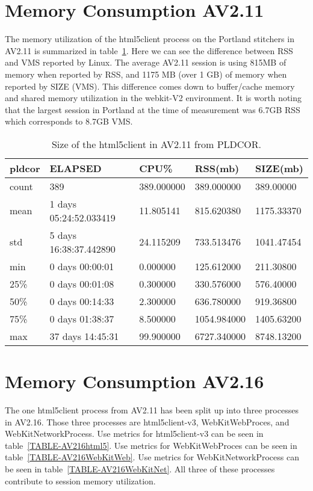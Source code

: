 \documentclass{article}
\begin{document}
\section{Memory Consumption AV2.11}
\label{SECTION-211Memory}


The memory utilization of the html5client process on the Portland stitchers in AV2.11 is summarized in table~\ref{TABLE-AV211SessionSize}. Here we can see the difference between RSS and VMS reported by Linux. The average AV2.11 session is using 815MB of memory when reported by RSS, and 1175 MB (over 1 GB) of memory when reported by SIZE (VMS). This difference comes down to buffer/cache memory and shared memory utilization in the webkit-V2 environment. It is worth noting that the largest session in Portland at the time of measurement was 6.7GB RSS which corresponds to 8.7GB VMS.



\begin{table}[H]
\begin{tabular}{|l|l|l|l|l|}
\hline pldcor& ELAPSED&   CPU\%&  RSS(mb)&   SIZE(mb) \\
\hline count&    389& 389.000000&  389.000000&  389.00000 \\
\hline mean&  1 days 05:24:52.033419&  11.805141&  815.620380& 1175.33370 \\
\hline std&  5 days 16:38:37.442890&  24.115209&  733.513476& 1041.47454 \\
\hline min&   0 days 00:00:01&  0.000000&  125.612000&  211.30800 \\
\hline 25\%&   0 days 00:01:08&  0.300000&  330.576000&  576.40000 \\
\hline 50\%&   0 days 00:14:33&  2.300000&  636.780000&  919.36800 \\
\hline 75\%&   0 days 01:38:37&  8.500000& 1054.984000& 1405.63200 \\
\hline max&  37 days 14:45:31&  99.900000& 6727.340000& 8748.13200 \\
\hline 
\end{tabular}
\caption{\label{TABLE-AV211SessionSize}Size of the html5client in AV2.11 from PLDCOR.} 
\end{table}

\newpage

\section{Memory Consumption AV2.16}
\label{SECTION-216Memory}

The one html5client process from AV2.11 has been split up into three processes in AV2.16. Those three processes are html5client-v3, WebKitWebProces, and WebKitNetworkProcess. Use metrics for html5client-v3 can be seen in table~\ref{TABLE-AV216html5}. Use metrics for WebKitWebProces can be seen in table~\ref{TABLE-AV216WebKitWeb}. Use metrics for WebKitNetworkProcess can be seen in table~\ref{TABLE-AV216WebKitNet}. All three of these processes contribute to session memory utilization. 
\end{document}
